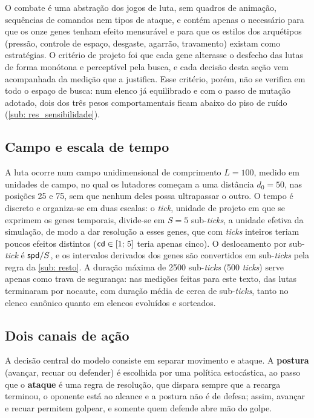 O combate é uma abstração dos jogos de luta, sem quadros de animação, sequências de comandos nem tipos de ataque, e contém apenas o necessário para que os onze genes tenham efeito mensurável e para que os estilos dos arquétipos (pressão, controle de espaço, desgaste, agarrão, travamento) existam como estratégias. O critério de projeto foi que cada gene alterasse o desfecho das lutas de forma monótona e perceptível pela busca, e cada decisão desta seção vem acompanhada da medição que a justifica. Esse critério, porém, não se verifica em todo o espaço de busca: num elenco já equilibrado e com o passo de mutação adotado, dois dos três pesos comportamentais ficam abaixo do piso de ruído (\autoref{sub: res_sensibilidade}).

\subsection{Campo e escala de tempo}
\label{sub: campo}

A luta ocorre num campo unidimensional de comprimento $L = 100$, medido em unidades de campo, no qual os lutadores começam a uma distância $d_0 = 50$, nas posições 25 e 75, sem que nenhum deles possa ultrapassar o outro. O tempo é discreto e organiza-se em duas escalas: o \textit{tick}, unidade de projeto em que se exprimem os genes temporais, divide-se em $S = 5$ sub-\textit{ticks}, a unidade efetiva da simulação, de modo a dar resolução a esses genes, que com \textit{ticks} inteiros teriam poucos efeitos distintos ($\mathsf{cd} \in [1;\, 5]$ teria apenas cinco). O deslocamento por sub-\textit{tick} é $\mathsf{spd}/S$, e os intervalos derivados dos genes são convertidos em sub-\textit{ticks} pela regra da \autoref{sub: resto}. A duração máxima de 2500 sub-\textit{ticks} (500 \textit{ticks}) serve apenas como trava de segurança: nas medições feitas para este texto, \koTaxa{} das lutas terminaram por nocaute, com duração média de cerca de \duracaoMediaSubticks{} sub-\textit{ticks}, tanto no elenco canônico quanto em elencos evoluídos e sorteados.

\subsection{Dois canais de ação}
\label{sub: canais}

A decisão central do modelo consiste em separar movimento e ataque. A \textbf{postura} (avançar, recuar ou defender) é escolhida por uma política estocástica, ao passo que o \textbf{ataque} é uma regra de resolução, que dispara sempre que a recarga terminou, o oponente está ao alcance e a postura não é de defesa; assim, avançar e recuar permitem golpear, e somente quem defende abre mão do golpe.

